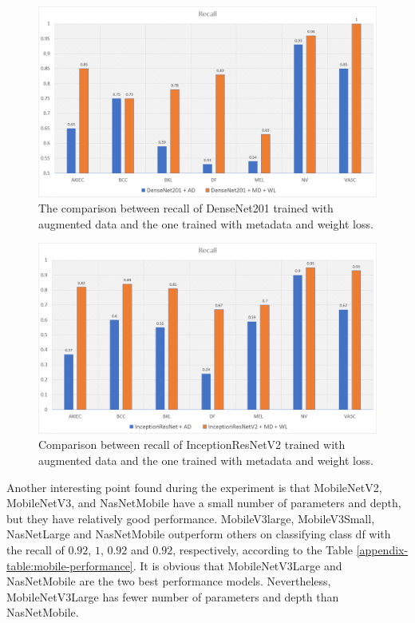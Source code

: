 \documentclass[sensors,article,accept,pdftex,moreauthors]{Definitions/mdpi}
\begin{document}
	\begin{figure}[H]
		\centering
		\includegraphics[width=1\linewidth]{Definitions/den re.PNG}
		\caption{The comparison between recall of DenseNet201 trained with augmented data and the one trained with metadata and weight loss.}
		\label{fig:den recall}
	\end{figure}\unskip
	
	\begin{figure}[H]
		\centering
		\includegraphics[width=1\linewidth]{Definitions/in re.PNG}
		\caption{Comparison between recall of InceptionResNetV2 trained with augmented data and the one trained with metadata and weight loss.}
		\label{fig:incep recall}
	\end{figure}
	
	Another interesting point found during the experiment is that MobileNetV2, MobileNetV3, and NasNetMobile have a small number of parameters and depth, but they have relatively good performance. MobileV3large, MobileV3Small, NasNetLarge and NasNetMobile outperform others on classifying class df with the recall of $0.92$, $1$, $0.92$ and  $0.92$, respectively, according to the Table \ref{appendix-table:mobile-performance}. It is obvious that MobileNetV3Large and NasNetMobile are the two best performance models. Nevertheless, MobileNetV3Large has fewer number of parameters and depth than NasNetMobile.
\end{document}
